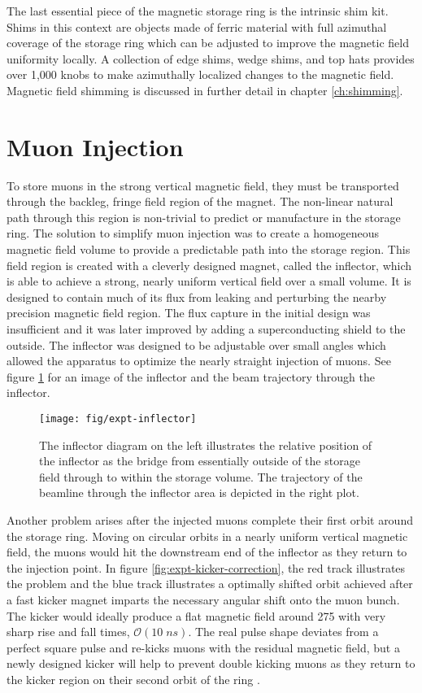 The last essential piece of the magnetic storage ring is the intrinsic shim kit.  Shims in this context are objects made of ferric material with full azimuthal coverage of the storage ring which can be adjusted to improve the magnetic field uniformity locally. A collection of edge shims, wedge shims, and top hats provides over 1,000 knobs to make azimuthally localized changes to the magnetic field.
Magnetic field shimming is discussed in further detail in chapter \ref{ch:shimming}.

\section{Muon Injection} \label{sec:muon-injection}
To store muons in the strong vertical magnetic field, they must be transported through the backleg, fringe field region of the magnet.  The non-linear natural path through this region is non-trivial to predict or manufacture in the storage ring.  The solution to simplify muon injection was to create a homogeneous magnetic field volume to provide a predictable path into the storage region. This field region is created with a cleverly designed magnet, called the inflector, which is able to achieve a strong, nearly uniform vertical field over a small volume.  It is designed to contain much of its flux from leaking and perturbing the nearby precision magnetic field region.  The flux capture in the initial design was insufficient and it was later improved by adding a superconducting shield to the outside.  The inflector was designed to be adjustable over small angles which allowed the apparatus to optimize the nearly straight injection of muons. See figure \ref{fig:expt-inflector} for an image of the inflector and the beam trajectory through the inflector. \cite{e989-tdr, e821-prd}

\begin{figure}
\label{fig:expt-inflector}
\texttt{[image: fig/expt-inflector]}
\caption{The inflector diagram on the left illustrates the relative position of the inflector as the bridge from essentially outside of the storage field through to within the storage volume.  The trajectory of the beamline through the inflector area is depicted in the right plot.}
\end{figure}

Another problem arises after the injected muons complete their first orbit around the storage ring.  Moving on circular orbits in a nearly uniform vertical magnetic field, the muons would hit the downstream end of the inflector as they return to the injection point.  In figure \ref{fig:expt-kicker-correction}, the red track illustrates the problem and the blue track illustrates a optimally shifted orbit achieved after a fast kicker magnet imparts the necessary angular shift onto the muon bunch.  The kicker would ideally produce a flat magnetic field around \SI{275}{\gauss} with very sharp rise and fall times, $\mathcal{O}(10\;ns)$.  The real pulse shape deviates from a perfect square pulse and re-kicks muons with the residual magnetic field, but a newly designed kicker will help to prevent double kicking muons as they return to the kicker region on their second orbit of the ring \cite{e989-tdr}.  

